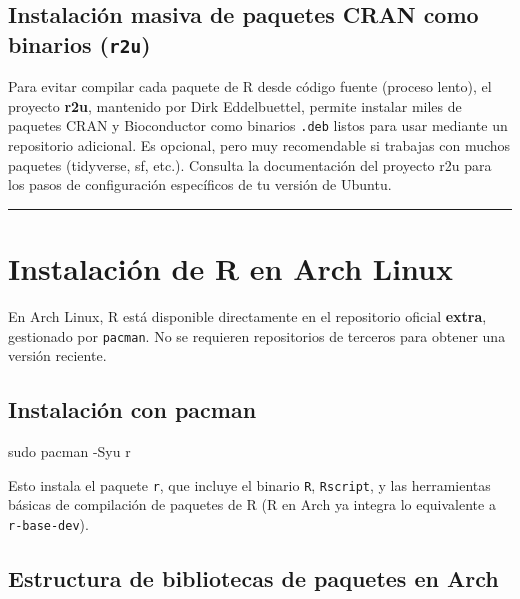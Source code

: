 \documentclass[
  man,
  floatsintext,
  longtable,
  a4paper,
  nolmodern,
  notxfonts,
  notimes,
  12pt,
  colorlinks=true,linkcolor=blue,citecolor=blue,urlcolor=blue]{apa7}
\newenvironment{Shaded}{\begin{snugshade}}{\end{snugshade}}
\newcommand{\AttributeTok}[1]{\textcolor[rgb]{0.40,0.45,0.13}{#1}}
\newcommand{\FunctionTok}[1]{\textcolor[rgb]{0.28,0.35,0.67}{#1}}
\newcommand{\NormalTok}[1]{\textcolor[rgb]{0.00,0.23,0.31}{#1}}
\begin{document}
\subsection{\texorpdfstring{Instalación masiva de paquetes CRAN como
binarios
(\texttt{r2u})}{Instalación masiva de paquetes CRAN como binarios (r2u)}}\label{instalaciuxf3n-masiva-de-paquetes-cran-como-binarios-r2u}

Para evitar compilar cada paquete de R desde código fuente (proceso
lento), el proyecto \textbf{r2u}, mantenido por Dirk Eddelbuettel,
permite instalar miles de paquetes CRAN y Bioconductor como binarios
\texttt{.deb} listos para usar mediante un repositorio adicional. Es
opcional, pero muy recomendable si trabajas con muchos paquetes
(tidyverse, sf, etc.). Consulta la documentación del proyecto r2u para
los pasos de configuración específicos de tu versión de Ubuntu.

\begin{center}\rule{0.5\linewidth}{0.5pt}\end{center}

\section{Instalación de R en Arch
Linux}\label{instalaciuxf3n-de-r-en-arch-linux}

En Arch Linux, R está disponible directamente en el repositorio oficial
\textbf{extra}, gestionado por \texttt{pacman}. No se requieren
repositorios de terceros para obtener una versión reciente.

\subsection{Instalación con pacman}\label{instalaciuxf3n-con-pacman}

\begin{Shaded}
\begin{Highlighting}[]
\FunctionTok{sudo}\NormalTok{ pacman }\AttributeTok{{-}Syu}\NormalTok{ r}
\end{Highlighting}
\end{Shaded}

Esto instala el paquete \texttt{r}, que incluye el binario \texttt{R},
\texttt{Rscript}, y las herramientas básicas de compilación de paquetes
de R (R en Arch ya integra lo equivalente a \texttt{r-base-dev}).

\subsection{Estructura de bibliotecas de paquetes en
Arch}\label{estructura-de-bibliotecas-de-paquetes-en-arch}
\end{document}
